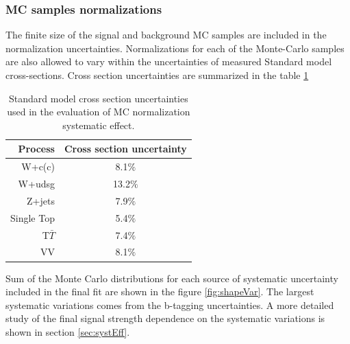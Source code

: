 \subsubsection*{MC samples normalizations}
        The finite size of the signal and background MC samples are included in the normalization uncertainties. Normalizations for each of the Monte-Carlo samples are also allowed to vary within the uncertainties of measured Standard model cross-sections. Cross section uncertainties are summarized in the table \ref{tab:SMunc}


\begin{table}[!htb]
\begin{center}
   \begin{tabular} {r c} \hline \hline
        Process         & Cross section uncertainty \\
        \hline
        W+c(c)          & 8.1$\%$ \\
        W+udsg          & 13.2$\%$ \\
        Z+jets          & 7.9$\%$ \\
        Single Top      & 5.4$\%$ \\
        T$\bar{T}$      & 7.4$\%$ \\
        VV              & 8.1$\%$ \\
        \hline\hline
   \end{tabular}
\caption{Standard model cross section uncertainties used in the evaluation of MC normalization systematic effect.}
\label{tab:SMunc}
\end{center}
\end{table}

Sum of the Monte Carlo distributions for each source of systematic uncertainty included in the final fit are shown in the figure \ref{fig:shapeVar}. The largest systematic variations comes from the b-tagging uncertainties. A more detailed study of the final signal strength dependence on the systematic variations is shown in section \ref{sec:systEff}.

